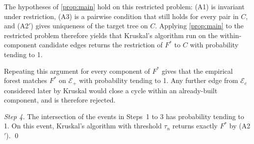 The hypotheses of \cref{prop:main} hold on this restricted
problem: (A1) is invariant under restriction, (A3) is a pairwise
condition that still holds for every pair in $C$, and (A2$'$)
gives uniqueness of the target tree on $C$. Applying
\cref{prop:main} to the restricted problem therefore yields that
Kruskal's algorithm run on the within-component candidate edges
returns the restriction of $F^*$ to $C$ with probability tending
to 1.

Repeating this argument for every component of $F^*$ gives that
the empirical forest matches $F^*$ on $\mathcal{E}_+$ with
probability tending to 1. Any further edge from $\mathcal{E}_c$
considered later by Kruskal would close a cycle within an
already-built component, and is therefore rejected.

\emph{Step 4.} The intersection of the events in Steps~1 to 3 has
probability tending to 1. On this event, Kruskal's algorithm with
threshold $\tau_n$ returns exactly $F^*$ by (A2$'$). \qed





